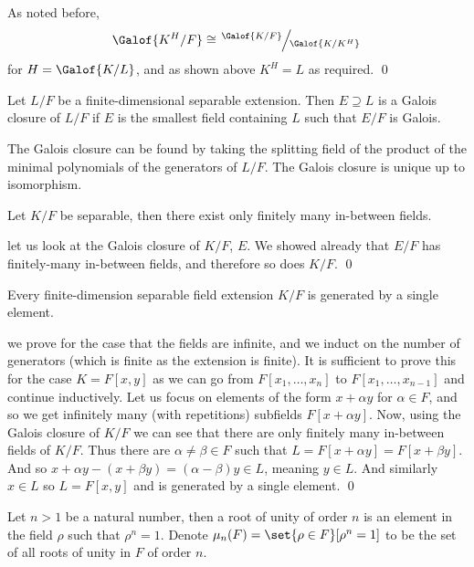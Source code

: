 As noted before, 
$$ \Galof{K^H/F} \cong \slfrac{\Galof{K/F}}{\Galof{K/K^H}} $$
for $H=\Galof{K/L}$, and as shown above $K^H=L$ as required.
\qed

\bdefn

    Let $L/F$ be a finite-dimensional separable extension.
    Then $E\supseteq L$ is a {\emphcolor Galois closure} of $L/F$ if $E$ is the smallest field containing $L$ such that $E/F$ is Galois.

\edefn

The Galois closure can be found by taking the splitting field of the product of the minimal polynomials of the generators of $L/F$.
The Galois closure is unique up to isomorphism.

\bthrm

    Let $K/F$ be separable, then there exist only finitely many in-between fields.

\ethrm

\Proof let us look at the Galois closure of $K/F$, $E$.
We showed already that $E/F$ has finitely-many in-between fields, and therefore so does $K/F$.
\qed

\bthrm[title=Steinitz's Theorem, name=steinitz]

    Every finite-dimension separable field extension $K/F$ is generated by a single element.

\ethrm

\Proof we prove for the case that the fields are infinite, and we induct on the number of generators (which is finite as the extension is finite).
It is sufficient to prove this for the case $K=F[x,y]$ as we can go from $F[x_1,\dots,x_n]$ to $F[x_1,\dots,x_{n-1}]$ and continue inductively.
Let us focus on elements of the form $x+\alpha y$ for $\alpha\in F$, and so we get infinitely many (with repetitions) subfields $F[x+\alpha y]$.
Now, using the Galois closure of $K/F$ we can see that there are only finitely many in-between fields of $K/F$.
Thus there are $\alpha\neq\beta\in F$ such that $L=F[x+\alpha y]=F[x+\beta y]$.
And so $x+\alpha y-(x+\beta y)=(\alpha-\beta)y\in L$, meaning $y\in L$.
And similarly $x\in L$ so $L=F[x,y]$ and is generated by a single element.
\qed

\bdefn

    Let $n>1$ be a natural number, then a {\emphcolor root of unity} of order $n$ is an element in the field $\rho$ such that $\rho^n=1$.
    Denote $\mu_n(F)=\set{\rho\in F}[\rho^n=1]$ to be the set of all roots of unity in $F$ of order $n$.

\edefn


